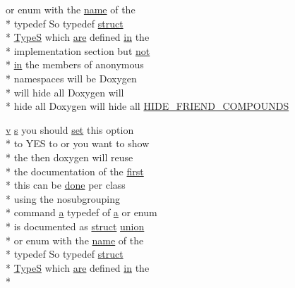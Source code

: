 \begin{DoxyCompactItemize}
or enum with the \hyperlink{glext_8h_ad977737dfc9a274a62741b9500c49a32}{name} of the \\*
typedef So typedef \hyperlink{sdlgamepad_8dox_aba655c5729da86df745f0c8e7f9ba8d2}{struct} \\*
\hyperlink{sdlgamepad_8dox_a25dd1c015abaf1e4f2c6879012f4f170}{Type\-S} which \hyperlink{sdlgamepad_8dox_a6d0965b20c4eb2235e8f9f5f0e5193ae}{are} defined \hyperlink{glext_8h_a83ad0ee7f1e06b59c90271716e689080}{in} the \\*
implementation section but \hyperlink{uavobjecttemplate_8m_acf8758da9d0019183b0d213755711ee7}{not} \\*
\hyperlink{glext_8h_a83ad0ee7f1e06b59c90271716e689080}{in} the members of anonymous \\*
namespaces will be Doxygen \\*
will hide all Doxygen will \\*
hide all Doxygen will hide all \hyperlink{sdlgamepad_8dox_a90cb1e2bfb8402bdac3320203fe5276a}{H\-I\-D\-E\-\_\-\-F\-R\-I\-E\-N\-D\-\_\-\-C\-O\-M\-P\-O\-U\-N\-D\-S}
\item 
\hyperlink{glext_8h_a14cfbe2fc2234f5504618905b69d1e06}{v} \hyperlink{glext_8h_ad585a1393cfa368fa9dc3d8ebff640d5}{s} you should \hyperlink{analyze_raw_8m_a11671e12e7b3fc5881313758d6cc0b45}{set} this option \\*
to Y\-E\-S to or you want to show \\*
the then doxygen will reuse \\*
the documentation of the \hyperlink{glext_8h_a970a385f6f880f2b620451db4ca4299a}{first} \\*
this can be \hyperlink{qxtslotjob_8h_afd848a85523ad0ba77464879add9c332}{done} per class \\*
using the nosubgrouping \\*
command \hyperlink{glext_8h_ac8729153468b5dcf13f971b21d84d4e5}{a} typedef of \hyperlink{glext_8h_ac8729153468b5dcf13f971b21d84d4e5}{a} or enum \\*
is documented as \hyperlink{sdlgamepad_8dox_aba655c5729da86df745f0c8e7f9ba8d2}{struct} \hyperlink{sdlgamepad_8dox_a68000add3c95d09ceb97c3079515907d}{union} \\*
or enum with the \hyperlink{glext_8h_ad977737dfc9a274a62741b9500c49a32}{name} of the \\*
typedef So typedef \hyperlink{sdlgamepad_8dox_aba655c5729da86df745f0c8e7f9ba8d2}{struct} \\*
\hyperlink{sdlgamepad_8dox_a25dd1c015abaf1e4f2c6879012f4f170}{Type\-S} which \hyperlink{sdlgamepad_8dox_a6d0965b20c4eb2235e8f9f5f0e5193ae}{are} defined \hyperlink{glext_8h_a83ad0ee7f1e06b59c90271716e689080}{in} the \\*

\end{DoxyCompactItemize}
